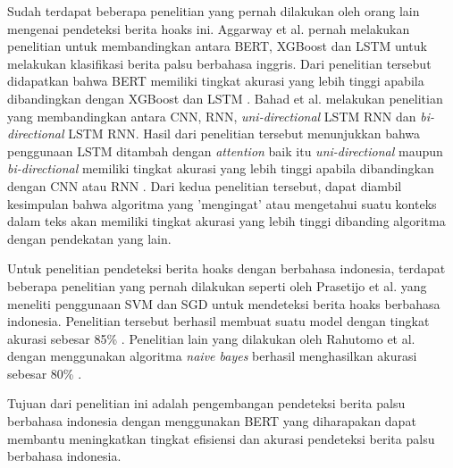 Sudah terdapat beberapa penelitian yang pernah dilakukan oleh orang lain mengenai pendeteksi berita hoaks ini. Aggarway et al. pernah melakukan penelitian untuk membandingkan antara BERT, XGBoost dan LSTM untuk melakukan klasifikasi berita palsu berbahasa inggris. Dari penelitian tersebut didapatkan bahwa BERT memiliki tingkat akurasi yang lebih tinggi apabila dibandingkan dengan XGBoost dan LSTM \cite{bert_news_classi}. Bahad et al. melakukan penelitian yang membandingkan antara CNN, RNN, \textit{uni-directional} LSTM RNN dan \textit{bi-directional} LSTM RNN. Hasil dari penelitian tersebut menunjukkan bahwa penggunaan LSTM ditambah dengan \textit{attention} baik itu \textit{uni-directional} maupun \textit{bi-directional} memiliki tingkat akurasi yang lebih tinggi apabila dibandingkan dengan CNN atau RNN \cite{bahad_lstm}. Dari kedua penelitian tersebut, dapat diambil kesimpulan bahwa algoritma yang 'mengingat' atau mengetahui suatu konteks dalam teks akan memiliki tingkat akurasi yang lebih tinggi dibanding algoritma dengan pendekatan yang lain.

Untuk penelitian pendeteksi berita hoaks dengan berbahasa indonesia, terdapat beberapa penelitian yang pernah dilakukan seperti oleh Prasetijo et al. yang meneliti penggunaan SVM dan SGD untuk mendeteksi berita hoaks berbahasa indonesia. Penelitian tersebut berhasil membuat suatu model dengan tingkat akurasi sebesar 85\% \cite{prasetijo}. Penelitian lain yang dilakukan oleh Rahutomo et al. dengan menggunakan algoritma \textit{naive bayes} berhasil menghasilkan akurasi sebesar 80\% \cite{rahutomo}.

Tujuan dari penelitian ini adalah pengembangan pendeteksi berita palsu berbahasa indonesia dengan menggunakan BERT yang diharapakan dapat membantu meningkatkan tingkat efisiensi dan akurasi pendeteksi berita palsu berbahasa indonesia.
